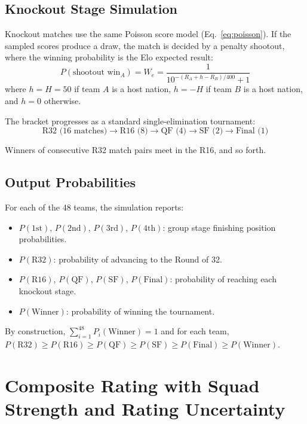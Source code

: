 \documentclass[11pt]{article}
\begin{document}
\subsection{Knockout Stage Simulation}

Knockout matches use the same Poisson score model (Eq.~\ref{eq:poisson}). If the sampled scores produce a draw, the match is decided by a penalty shootout, where the winning probability is the Elo expected result:
\begin{equation}
P(\text{shootout win}_A) = W_e = \frac{1}{10^{-(R_A + h - R_B)/400} + 1}
\end{equation}
where $h = H = 50$ if team $A$ is a host nation, $h = -H$ if team $B$ is a host nation, and $h = 0$ otherwise.

The bracket progresses as a standard single-elimination tournament:
\[
\text{R32 (16 matches)} \to \text{R16 (8)} \to \text{QF (4)} \to \text{SF (2)} \to \text{Final (1)}
\]

Winners of consecutive R32 match pairs meet in the R16, and so forth.

\subsection{Output Probabilities}

For each of the 48 teams, the simulation reports:
\begin{itemize}[nosep]
    \item $P(\text{1st})$, $P(\text{2nd})$, $P(\text{3rd})$, $P(\text{4th})$: group stage finishing position probabilities.
    \item $P(\text{R32})$: probability of advancing to the Round of 32.
    \item $P(\text{R16})$, $P(\text{QF})$, $P(\text{SF})$, $P(\text{Final})$: probability of reaching each knockout stage.
    \item $P(\text{Winner})$: probability of winning the tournament.
\end{itemize}

By construction, $\sum_{i=1}^{48} P_i(\text{Winner}) = 1$ and for each team, $P(\text{R32}) \geq P(\text{R16}) \geq P(\text{QF}) \geq P(\text{SF}) \geq P(\text{Final}) \geq P(\text{Winner})$.

\section{Composite Rating with Squad Strength and Rating Uncertainty}
\label{sec:squadstrength}
\end{document}
